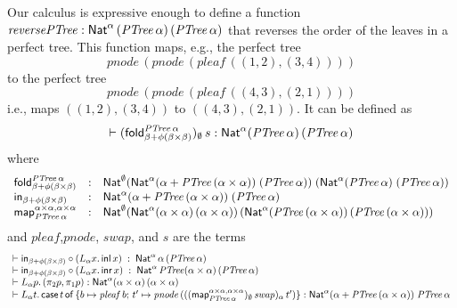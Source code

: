 \documentclass{lmcs}
\theoremstyle{plain}\newtheorem{satz}[thm]{Satz}
\newcommand{\inl}{\mathsf{inl}}
\newcommand{\inr}{\mathsf{inr}}
\newcommand{\fold}{\mathsf{fold}}
\newcommand{\map}{\mathsf{map}}
\begin{document}
{\vspace*{0.1in}

Our calculus is expressive enough to define a function
$\mathit{reversePTree :
  \mathsf{Nat}^\alpha\,(\mathit{PTree}\,\alpha)\,(\mathit{PTree}\,\alpha)}$
that reverses the order of the leaves in a perfect tree. This function
maps, e.g., the perfect tree
\[\mathit{pnode}\,(\mathit{pnode}\,(\mathit{pleaf}\,
((1, 2), (3, 4))))\]
to the perfect tree
\[\mathit{pnode}\,(\mathit{pnode}\,(\mathit{pleaf}\,
((4, 3), (2, 1))))\]
i.e., maps $((1,2),(3,4))$
to $((4,3),(2,1))$.  It can be defined as
\[\vdash (\fold_{\beta + \phi(\beta \times \beta)}^{\mathit{PTree}\,
  \alpha})_\emptyset \, s : \Nat^{\alpha}
(\mathit{PTree}\,\alpha)\,(\mathit{PTree}\,\alpha)\] where
\[\begin{array}{lll}
\fold_{\beta + \phi(\beta \times \beta)}^{\mathit{PTree}\,\alpha} & :
& \Nat^{\emptyset} (\Nat^{\alpha} (\alpha + \mathit{PTree}\,(\alpha
\times \alpha)) \; (\mathit{PTree}\,\alpha))\; (\Nat^{\alpha}
(\mathit{PTree}\,\alpha) \; (\mathit{PTree}\,\alpha))\\
\tin_{\beta + \phi(\beta \times \beta)} & : & \Nat^{\alpha} (\alpha +
\mathit{PTree}\,(\alpha \times \alpha)) \; (\mathit{PTree}\, \alpha)\\
\map_{\mathit{PTree}\,\alpha}^{\alpha \times \alpha, \alpha \times
  \alpha} & : & \Nat^\emptyset
(\Nat^{\alpha} (\alpha \times \alpha)\, (\alpha \times
\alpha))\,
(\Nat^{\alpha} (\mathit{PTree}\,(\alpha \times
\alpha))\, (\mathit{PTree}\,(\alpha \times \alpha)))
\end{array}\]
and 
$\mathit{pleaf}$,$\mathit{pnode}$, $\mathit{swap}$, and $s$ are the terms
\[\begin{array}{l}
\vdash \tin_{\beta + \phi (\beta \times \beta)} \circ (
L_{\alpha} x.\, \inl\, x) \; : \; \Nat^{\alpha}\, \alpha\,
(\mathit{PTree}\,\alpha)\\ 
\vdash \tin_{\beta + \phi (\beta \times \beta)} \circ (
L_{\alpha} x.\, \inr\, x) \; : \; \Nat^{\alpha}\, \mathit{PTree}
(\alpha \times \alpha)\,(\mathit{PTree}\,\alpha)\\ 
\vdash L_{\alpha} p.\, (\pi_2 p, \pi_1 p) :
\Nat^{\alpha} (\alpha \times \alpha)\, (\alpha \times \alpha)\\
\vdash L_{\alpha} t. \,\cse{t}{b \mapsto
 \mathit{pleaf}\, b}{t' \mapsto \mathit{pnode}\, 
    (((\map_{\mathit{PTree}\,\alpha}^{\alpha \times \alpha, \alpha \times
      \alpha})_\emptyset\, \mathit{swap})_\alpha\, t')}
:  \Nat^{\alpha} (\alpha + \mathit{PTree}\,(\alpha \times
\alpha))\; \mathit{PTree}\,\alpha

\end{array}\]}
\end{document}
